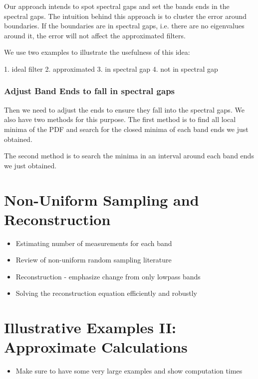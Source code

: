 \documentclass[a4paper]{article}
\theoremstyle{definition}
\begin{document}
Our approach intends to spot spectral gaps and set the bands ends in the spectral gaps. The intuition behind this approach is to cluster the error around boundaries. If the boundaries are in spectral gaps, i.e. there are no eigenvalues around it, the error will not affect the approximated filters.

We use two examples to illustrate the usefulness of this idea:

1. ideal filter
2. approximated
3. in spectral gap
4. not in spectral gap\\


\subsubsection{Adjust Band Ends to fall in spectral gaps}
Then we need to adjust the ends to ensure they fall into the spectral gaps. We also have two methods for this purpose. 
The first method is to find all local minima of the PDF and search for the closed minima of each band ends we just obtained.

The second method is to search the minima in an interval around each band ends we just obtained.




{\color{blue}
\section{Non-Uniform Sampling and Reconstruction}
\begin{itemize}
\item Estimating number of measurements for each band
\item Review of non-uniform random sampling literature
\item Reconstruction - emphasize change from only lowpass bands
\item {\color{red} Solving the reconstruction equation efficiently and robustly}
\end{itemize}
}





{\color{blue}
\section{Illustrative Examples II: Approximate Calculations}
\begin{itemize}
\item Make sure to have some very large examples and show computation times
\end{itemize}
}
\end{document}
